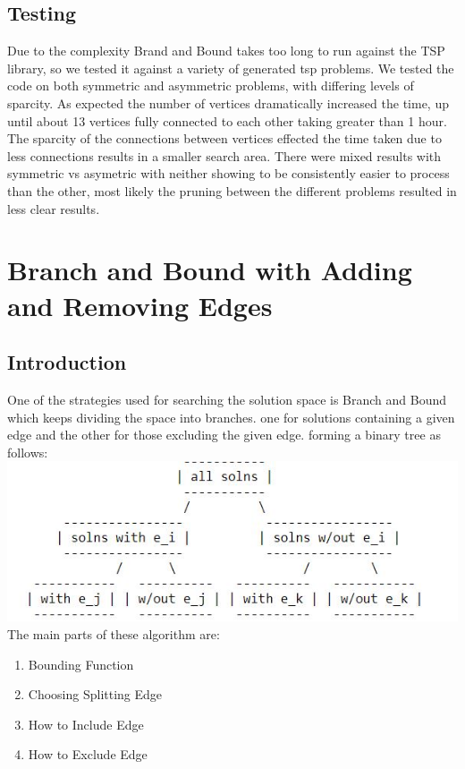\documentclass[11pt, english]{article}
\begin{document}
\subsection{Testing}
Due to the complexity Brand and Bound takes too long to run against the TSP library, so we tested it against a variety of generated tsp problems. We tested the code on both symmetric and asymmetric problems, with differing levels of sparcity. As expected the number of vertices dramatically increased the time, up until about 13 vertices fully connected to each other taking greater than 1 hour. The sparcity of the connections between vertices effected the time taken due to less connections results in a smaller search area. There were mixed results with symmetric vs asymetric with neither showing to be consistently easier to process than the other, most likely the pruning between the different problems resulted in less clear results.




\newpage
\section{Branch and Bound with Adding and Removing Edges}
\subsection{Introduction}
One of the strategies used for searching the solution space is Branch and Bound which keeps dividing the space into branches. one for solutions containing a given edge and the other for those excluding the given edge. forming a binary tree as follows:
\newline \newline
\includegraphics[width=\textwidth] {solution-tree.jpg}
\newline \newline
The main parts of these algorithm are:
\begin{enumerate}
    \item Bounding Function
    \item Choosing Splitting Edge
    \item How to Include Edge
    \item How to Exclude Edge
\end{enumerate}
\end{document}
